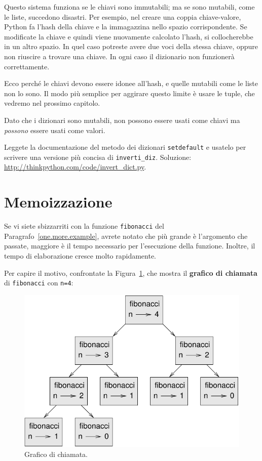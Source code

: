 \documentclass[10pt]{book}
\begin{document}
Questo sistema funziona se le chiavi sono immutabili; ma se sono mutabili, come le liste, succedono disastri. Per esempio, nel creare una coppia chiave-valore, Python fa l'hash della chiave e la immagazzina nello spazio corrispondente. Se modificate la chiave e quindi viene nuovamente calcolato l'hash, si collocherebbe in un altro spazio. In quel caso potreste avere due voci della stessa chiave, oppure non riuscire a trovare una chiave. In ogni caso il dizionario non funzionerà correttamente.

Ecco perché le chiavi devono essere idonee all'hash, e quelle mutabili come le liste non lo sono. Il modo più semplice per aggirare questo limite è usare le tuple, che vedremo nel prossimo capitolo.

Dato che i dizionari sono mutabili, non possono essere usati come chiavi ma {\em possono} essere usati come valori.

\vspace{0.2in}
\begin{exercise}
Leggete la documentazione del metodo dei dizionari {\tt setdefault}
e usatelo per scrivere una versione più concisa di \verb"inverti_diz".
Soluzione: \url{http://thinkpython.com/code/invert_dict.py}.

\end{exercise}


\section{Memoizzazione}

Se vi siete sbizzarriti con la funzione {\tt fibonacci} del Paragrafo~\ref{one.more.example}, avrete notato che più grande è l'argomento che passate, maggiore è il tempo necessario per l'esecuzione della funzione. Inoltre, il tempo di elaborazione cresce molto rapidamente.

Per capire il motivo, confrontate la Figura~\ref{fig.fibonacci}, che mostra il {\bf grafico di chiamata} di {\tt fibonacci} con {\tt n=4}:

\begin{figure}
\centerline
{\includegraphics[scale=0.7]{figs/fibonacci.pdf}}
\caption{Grafico di chiamata.}
\label{fig.fibonacci}
\end{figure}
\end{document}
